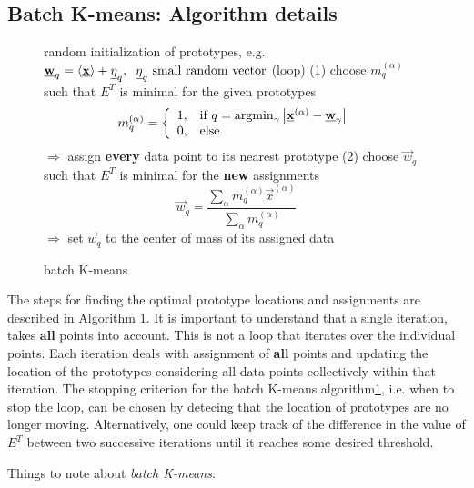 \begin{frame}
\section{Batch K-means: Algorithm details}

\vspace{-0.4cm}
\begin{figure}[!th]
\footnotesize
\removelatexerror
\begin{algorithm}[H]
\DontPrintSemicolon
  random initialization of prototypes, e.g.\ $\vec{w}_{q} = \langle \vec{x} \rangle +\vec{\eta}_{q}, \hspace{0.2cm} \vec{\eta}_{q}  \text{ small random vector}$\;
  \Begin(loop){
  (1) choose  $m_q^{(\alpha)}$ such that $E^T$ is minimal for the given prototypes\;
\[ m_q^{(\alpha)} = \left\{ \begin{array}{ll}
	1, & \text{if } q = \argmin_{\gamma} \big| \vec{x}^{(\alpha)}
		- \vec{w}_{\gamma} \big| \\
	0, & \text{else}
\end{array} \right. \]
$\Rightarrow$ assign \textbf{every} data point to its nearest prototype \;
\;
(2) choose  $\vec{w}_q$ such that $E^T$ is minimal for the \textbf{new} assignments\;
\[ \vec{w}_q = \frac{\sum\limits_{\alpha} m_q^{(\alpha)} \vec{x}^{(\alpha)}}{
	\sum\limits_{\alpha} m_q^{(\alpha)}}
\]
$\Rightarrow$ set $\vec{w}_q$ to the center of mass of its assigned data
}
    \label{alg:batch-k-means}
    \caption{batch K-means}
\end{algorithm}
\end{figure}
\end{frame}

The steps for finding the optimal prototype locations and assignments are described in Algorithm \ref{alg:batch-k-means}.
It is important to understand that a single iteration, takes \textbf{all} points into account. This is not a loop that iterates over the individual points. Each iteration deals with assignment of \textbf{all} points and updating the location of the prototypes considering all data points collectively within that iteration.
The stopping criterion for the batch K-means algorithm\ref{alg:batch-k-means}, i.e. when to stop the loop, can be chosen by detecing that the location of prototypes are no longer moving. Alternatively, one could keep track of the difference in the value of $E^T$ between two successive iterations until it reaches some desired threshold.
 
Things to note about \emph{batch K-means}:

